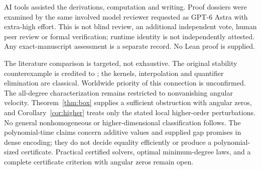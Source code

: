 \documentclass[11pt,a4paper]{article}
\theoremstyle{remark}\newtheorem{remark}[theorem]{Remark}
\begin{document}
AI tools assisted the derivations, computation and writing.
Proof dossiers were examined by the same involved model reviewer
requested as GPT-6 Astra with extra-high effort. This is not blind
review, an additional independent vote, human peer review or formal
verification; runtime identity is not independently attested.
Any exact-manuscript assessment is a separate record.
No Lean proof is supplied.

The literature comparison is targeted, not exhaustive.
The original stability counterexample is credited to \cite{liu};
the kernels, interpolation and quantifier elimination are classical.
Worldwide priority of this connection is unconfirmed.
The all-degree characterization remains restricted to nonvanishing
angular velocity. Theorem~\ref{thm:box} supplies a sufficient obstruction
with angular zeros, and Corollary~\ref{cor:higher} treats only the stated
local higher-order perturbations. No general nonhomogeneous or
higher-dimensional classification follows. The polynomial-time claims
concern additive values and supplied gap promises in dense encoding;
they do not decide equality efficiently or produce a polynomial-sized
certificate. Practical certified solvers, optimal minimum-degree laws,
and a complete certificate criterion with angular zeros remain open.
\end{document}

